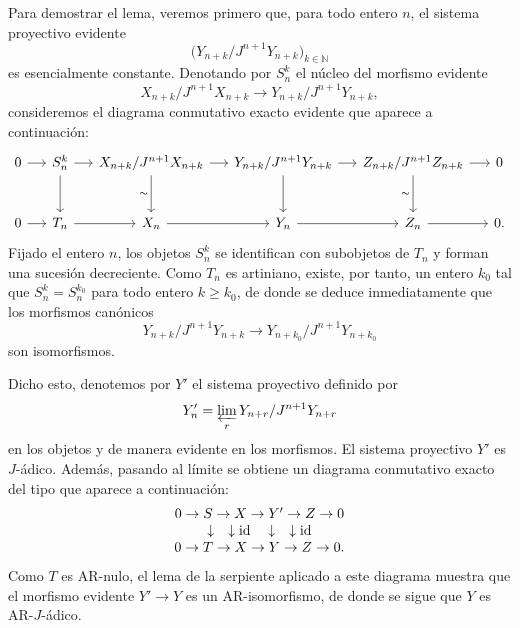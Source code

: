 \begin{prooftext}
Para demostrar el lema, veremos primero que, para todo entero \(n\), el sistema proyectivo evidente
\[
\bigl(Y_{n+k}/J^{n+1}Y_{n+k}\bigr)_{k\in\mathbb N}
\]
es esencialmente constante. Denotando por \(S_n^k\) el núcleo del morfismo evidente
\[
X_{n+k}/J^{n+1}X_{n+k}\longrightarrow
Y_{n+k}/J^{n+1}Y_{n+k},
\]
consideremos el diagrama conmutativo exacto evidente que aparece a continuación:
\[
\begin{tikzcd}[column sep=1.35em,row sep=large]
0 \arrow[r] & S_n^k \arrow[r] \arrow[d] & X_{n+k}/J^{n+1}X_{n+k} \arrow[r] \arrow[d,"\sim"'] & Y_{n+k}/J^{n+1}Y_{n+k} \arrow[r] \arrow[d] & Z_{n+k}/J^{n+1}Z_{n+k} \arrow[r] \arrow[d,"\sim"'] & 0\\
0 \arrow[r] & T_n \arrow[r] & X_n \arrow[r] & Y_n \arrow[r] & Z_n \arrow[r] & 0 .
\end{tikzcd}
\]
Fijado el entero \(n\), los objetos \(S_n^k\) se identifican con subobjetos de \(T_n\) y forman una sucesión decreciente. Como \(T_n\) es artiniano, existe, por tanto, un entero \(k_0\) tal que \(S_n^k=S_n^{k_0}\) para todo entero \(k\ge k_0\), de donde se deduce inmediatamente que los morfismos canónicos
\[
Y_{n+k}/J^{n+1}Y_{n+k}
\longrightarrow
Y_{n+k_0}/J^{n+1}Y_{n+k_0}
\]
son isomorfismos.

Dicho esto, denotemos por \(Y'\) el sistema proyectivo definido por
\[
Y'_n=\varprojlim_r Y_{n+r}/J^{n+1}Y_{n+r}
\]
en los objetos y de manera evidente en los morfismos. El sistema proyectivo \(Y'\) es \(J\)-ádico. Además, pasando al límite se obtiene un diagrama conmutativo exacto del tipo que aparece a continuación:
\[
\begin{array}{ccccc}
0\to S\to X\to Y'\to Z\to0\\
\downarrow\quad\downarrow\operatorname{id}\quad\downarrow\quad\downarrow\operatorname{id}\\
0\to T\to X\to Y\to Z\to0 .
\end{array}
\]
Como \(T\) es AR-nulo, el lema de la serpiente aplicado a este diagrama muestra que el morfismo evidente \(Y'\to Y\) es un AR-isomorfismo, de donde se sigue que \(Y\) es AR-\(J\)-ádico.
\end{prooftext}
